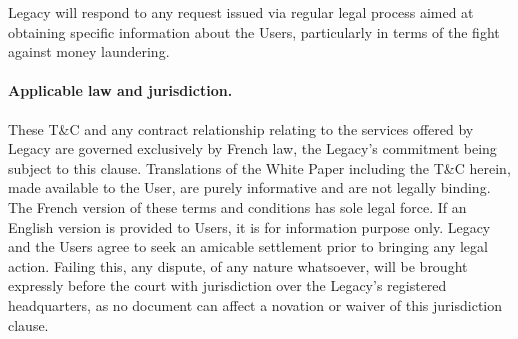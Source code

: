 \vspace{2mm}
Legacy will respond to any request issued via regular legal process aimed at obtaining specific information about the Users, particularly in terms of the fight against money laundering.

\paragraph{Applicable law and jurisdiction.}
These T\&C and any contract relationship relating to the services offered by Legacy are governed exclusively by French law, the Legacy's commitment being subject to this clause. Translations of the White Paper including the T\&C herein, made available to the User, are purely informative and are not legally binding. The French version of these terms and conditions has sole legal force. If an English version is provided to Users, it is for information purpose only.
Legacy and the Users agree to seek an amicable settlement prior to bringing any legal action. Failing this, any dispute, of any nature whatsoever, will be brought expressly before the court with jurisdiction over the Legacy's registered headquarters, as no document can affect a novation or waiver of this jurisdiction clause.

